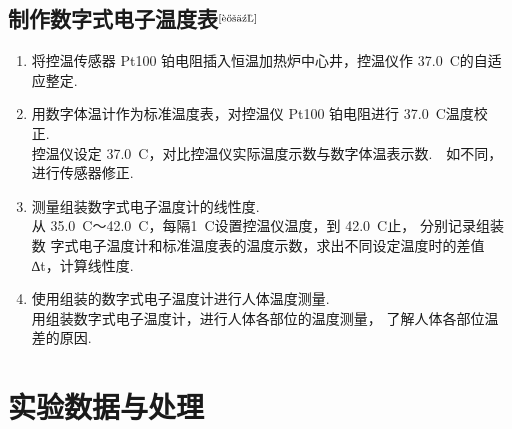 \documentclass[a4paper,12pt]{article}%
\begin{document}
\subsection{制作数字式电子温度表$^\text{\cite{讲义}}$}
\begin{spacing}{1.528}%
    \begin{enumerate}
        \item 将控温传感器 Pt100 铂电阻插入恒温加热炉中心井，控温仪作 37.0~\degree  C的自适应整定.
        \item 用数字体温计作为标准温度表，对控温仪 Pt100 铂电阻进行 37.0~\degree  C温度校正.~~\\
                控温仪设定 37.0~\degree  C，对比控温仪实际温度示数与数字体温表示数.~~如不同，进行传感器修正.
        \item 测量组装数字式电子温度计的线性度.~~\\
                从 35.0~\degree  C～42.0~\degree  C，每隔1~\degree  C设置控温仪温度，到 42.0~\degree  C止，
                分别记录组装数 字式电子温度计和标准温度表的温度示数，求出不同设定温度时的差值∆t，计算线性度.~~ 
        \item 使用组装的数字式电子温度计进行人体温度测量.~~\\
        用组装数字式电子温度计，进行人体各部位的温度测量，
                了解人体各部位温差的原因.~~
    \end{enumerate}
\end{spacing}

\section{实验数据与处理}
\end{document}
